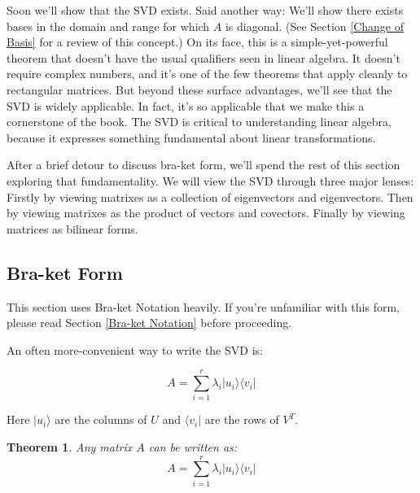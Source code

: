 \documentclass{amsbook}
\newtheorem{theorem}{Theorem}
\begin{document}
Soon we'll show that the SVD exists.  Said another way:  We'll show there exists bases in the domain and range for which $A$ is diagonal.  (See Section \ref{Change of Basis} for a review of this concept.)  On its face, this is a simple-yet-powerful theorem that doesn't have the usual qualifiers seen in linear algebra.  It doesn't require complex numbers, and it's one of the few theorems that apply cleanly to rectangular matrices.  But beyond these surface advantages, we'll see that the SVD is widely applicable.  In fact, it's so applicable that we make this a cornerstone of the book.  The SVD is critical to understanding linear algebra, because it expresses something fundamental about linear transformations.

After a brief detour to discuss bra-ket form, we'll spend the rest of this section exploring that fundamentality.  We will view the SVD through three major lenses:  Firstly by viewing matrixes as a collection of eigenvectors and eigenvectors.  Then by viewing matrixes as the product of vectors and covectors.  Finally by viewing matrices as bilinear forms.

\subsection{Bra-ket Form}

This section uses Bra-ket Notation heavily.  If you're unfamiliar with this form, please read Section \ref{Bra-ket Notation} before proceeding.

An often more-convenient way to write the SVD is:

$$
A=\sum_{i=1}^r\lambda_i| u _i\rangle\langle v _i|
$$

\noindent
Here $| u _i\rangle$ are the columns of $U$ and $\langle v _i|$ are the rows of $V^T$.

\begin{theorem}
Any matrix $A$ can be written as:
$$
A=\sum_{i=1}^r\lambda_i| u _i\rangle\langle v _i|
$$
 \end{theorem}
\end{document}
